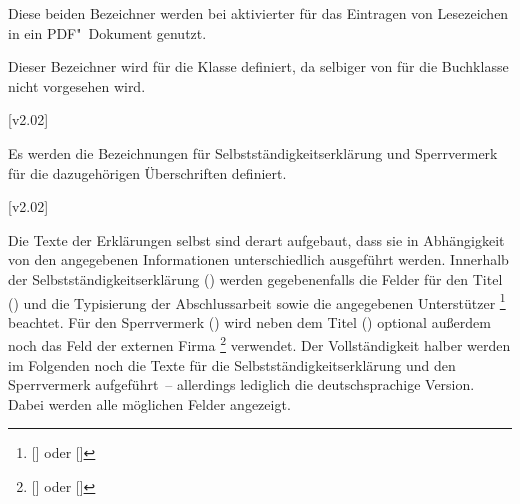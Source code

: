 \begin{DeclareEntity*}{}
\begin{DeclareEntity*}{}
\begin{DeclareEntity*}{}
\begin{Declaration}
  {}
\begin{Declaration}
  {}
\printdeclarationlist[Lesezeichen]

Diese beiden Bezeichner werden bei aktivierter  für das 
Eintragen von Lesezeichen in ein PDF"~Dokument genutzt.
%
\end{Declaration}
\end{Declaration}

\begin{Declaration}
  {}
\printdeclarationlist[Zusammenfassung]

Dieser Bezeichner wird für die Klasse  definiert, da selbiger 
von \KOMAScript für die Buchklasse nicht vorgesehen wird.
%
\end{Declaration}

\begin{Declaration}
  {}
\begin{Declaration}
  {}
  [v2.02]

Es werden die Bezeichnungen für Selbstständigkeitserklärung und Sperrvermerk 
für die dazugehörigen Überschriften definiert.
%
\end{Declaration}
\end{Declaration}

\begin{Declaration}
  {}
\begin{Declaration}
  {}
  [v2.02]

Die Texte der Erklärungen selbst sind derart aufgebaut, dass sie in 
Abhängigkeit von den angegebenen Informationen unterschiedlich ausgeführt 
werden. Innerhalb der Selbstständigkeitserklärung () werden 
gegebenenfalls die Felder für den Titel () und die Typisierung der 
Abschlussarbeit sowie die angegebenen Unterstützer%
\footnote{%
  [] oder []%
}
beachtet. Für den Sperrvermerk () wird neben dem Titel 
() optional außerdem noch das Feld der externen Firma%
\footnote{%
  []
  oder []%
}
verwendet. Der Vollständigkeit halber werden im Folgenden noch die Texte für 
die Selbstständigkeitserklärung und den Sperrvermerk aufgeführt~-- allerdings 
lediglich die deutschsprachige Version. Dabei werden alle möglichen Felder 
angezeigt.


\end{Declaration}
\end{Declaration}
\end{DeclareEntity*}
\end{DeclareEntity*}
\end{DeclareEntity*}
